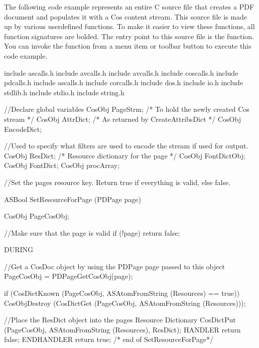 \documentclass[letterpaper,12pt,english,openany,oneside]{sphinxmanual}
\begin{document}
The following code example represents an entire C source file that creates a PDF document and populates it with a Cos content stream. This source file is made up by various user\sphinxhyphen{}defined functions. To make it easier to view these functions, all function signatures are bolded. The entry point to this source file is the  function. You can invoke the  function from a menu item or toolbar button to execute this code example.

\begin{sphinxVerbatim}[commandchars=\\\{\}]
\PYGZsh{}include \PYGZdq{}ascalls.h\PYGZdq{}
\PYGZsh{}include \PYGZdq{}avcalls.h\PYGZdq{}
\PYGZsh{}include \PYGZdq{}avcalls.h\PYGZdq{}
\PYGZsh{}include \PYGZdq{}coscalls.h\PYGZdq{}
\PYGZsh{}include \PYGZdq{}pdcalls.h\PYGZdq{}
\PYGZsh{}include \PYGZdq{}ascalls.h\PYGZdq{}
\PYGZsh{}include \PYGZdq{}corcalls.h\PYGZdq{}
\PYGZsh{}include \PYGZdq{}dos.h\PYGZdq{}
\PYGZsh{}include \PYGZlt{}io.h\PYGZgt{}
\PYGZsh{}include \PYGZlt{}stdlib.h\PYGZgt{}
\PYGZsh{}include \PYGZlt{}stdio.h\PYGZgt{}
\PYGZsh{}include \PYGZlt{}string.h\PYGZgt{}

//Declare global variables
CosObj PageStrm; /* To hold the newly created Cos stream */
CosObj AttrDict; /* As returned by CreateAttribsDict */
CosObj EncodeDict;

//Used to specify what filters are used to encode the stream if used for output.
CosObj ResDict; /* Resource dictionary for the page */
CosObj FontDictObj;
CosObj FontDict;
CosObj procArray;

//Set the page\PYGZsq{}s resource key. Return true if everything is valid, else false.

ASBool SetResourceForPage (PDPage page)

\PYGZob{}
CosObj PageCosObj;

//Make sure that the page is valid
if (!page)
  return false;

DURING

//Get a CosDoc object by using the PDPage page passed to this object
PageCosObj = PDPageGetCosObj(page);

  if (CosDictKnown (PageCosObj, ASAtomFromString (\PYGZdq{}Resources\PYGZdq{}) == true))
      CosObjDestroy (CosDictGet (PageCosObj, ASAtomFromString (\PYGZdq{}Resources\PYGZdq{})));


//Place the ResDict object into the page\PYGZsq{}s Resource Dictionary
CosDictPut (PageCosObj, ASAtomFromString (\PYGZdq{}Resources\PYGZdq{}), ResDict);
HANDLER
  return false;
END\PYGZus{}HANDLER
return true;
\PYGZcb{} /* end of SetResourceForPage*/


\end{sphinxVerbatim}
\end{document}
